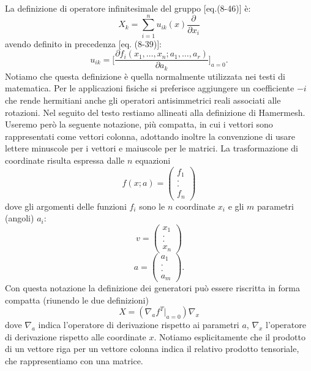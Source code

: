 \documentclass[fleqn,italian]{article}
\theoremstyle{definition}
\theoremstyle{remark}
\newcommand{\pd}[2]{\frac{\partial{#1}}{\partial{#2}}}
\theoremstyle{plain}%
\theoremstyle{definition}
\theoremstyle{remark}
\numberwithin{equation}{section}
\numberwithin{thm}{section}
\begin{document}
La definizione di operatore infinitesimale del gruppo [eq.(8-46)] \`e:
\begin{equation}
X_k=\sum^n_{i=1}u_{ik}(x)\pd{}{x_i}
\end{equation}
avendo definito in precedenza [eq. (8-39)]:
\begin{equation}
u_{ik}=\Biggl[\pd{f_i(x_1,\dots,x_n;a_1,\dots,a_r)}{a_k}\Biggr]_{a=0}.
\end{equation}
Notiamo che questa definizione \`e quella normalmente utilizzata nei
testi di matematica. Per le applicazioni fisiche si preferisce aggiungere
un coefficiente $-i$ che rende hermitiani anche gli operatori 
antisimmetrici reali associati alle rotazioni. Nel seguito del testo
restiamo allineati alla definizione di Hamermesh. Useremo per\`o la
seguente notazione, pi\`u compatta, in cui i vettori sono rappresentati
come vettori colonna, adottando inoltre la convenzione di usare lettere
minuscole per i vettori e maiuscole per le matrici. La trasformazione di
coordinate risulta espressa dalle $n$ equazioni
\begin{equation}
f(x;a)=\begin{pmatrix} f_1\\ . \\ . \\ f_n\end{pmatrix}
\end{equation}
dove gli argomenti delle funzioni $f_i$ sono le $n$ coordinate $x_i$ e gli
$m$ parametri (angoli) $a_i$:
\begin{equation}
v=\begin{pmatrix} x_1\\ . \\ . \\ x_n\end{pmatrix} 
\end{equation}
\begin{equation}
a=\begin{pmatrix} a_1\\ . \\ . \\ a_m\end{pmatrix}.
\end{equation}
Con questa notazione la definizione dei generatori pu\`o essere riscritta
in forma compatta (riunendo le due definizioni) 
\begin{equation}
X=(\nabla_a f^T\vert_{a=0})\nabla_x
\end{equation}
dove $\nabla_a$ indica l'operatore di derivazione rispetto ai parametri $a$,
$\nabla_x$ l'operatore di derivazione rispetto alle coordinate $x$. Notiamo
esplicitamente che il prodotto di un vettore riga per un vettore colonna 
indica il relativo prodotto tensoriale, che rappresentiamo con una matrice.
\end{document}
